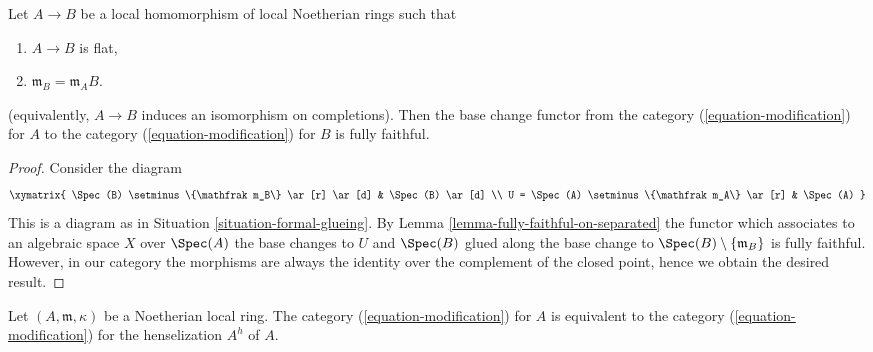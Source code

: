 \begin{lemma}
\label{lemma-fully-faithfulness-to-completion}
Let $A \to B$ be a local homomorphism of local Noetherian rings such that
\begin{enumerate}
\item $A \to B$ is flat,
\item $\mathfrak m_B = \mathfrak m_A B$.
\end{enumerate}
(equivalently, $A \to B$ induces an isomorphism on completions).
Then the base change functor from the category
(\ref{equation-modification}) for $A$ to the category
(\ref{equation-modification}) for $B$
is fully faithful.
\end{lemma}

\begin{proof}
Consider the diagram
$$
\xymatrix{
\Spec(B) \setminus \{\mathfrak m_B\} \ar[r] \ar[d] & \Spec(B) \ar[d] \\
U = \Spec(A) \setminus \{\mathfrak m_A\} \ar[r] & \Spec(A)
}
$$
This is a diagram as in Situation \ref{situation-formal-glueing}.
By Lemma \ref{lemma-fully-faithful-on-separated} the functor which
associates to an algebraic space
$X$ over $\Spec(A)$ the base changes to $U$ and $\Spec(B)$
glued along the base change to $\Spec(B) \setminus \{\mathfrak m_B\}$
is fully faithful. However, in our category the morphisms are always
the identity over the complement of the closed point, hence we
obtain the desired result.
\end{proof}

\begin{lemma}
\label{lemma-henselian}
Let $(A, \mathfrak m, \kappa)$ be a Noetherian local ring.
The category (\ref{equation-modification}) for $A$
is equivalent to the category (\ref{equation-modification})
for the henselization $A^h$ of $A$.
\end{lemma}

